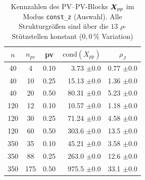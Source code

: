 \begin{table}[htbp]
	\centering
	\caption{Kennzahlen des PV--PV-Blocks $\boldsymbol{X}_{pp}$ im Modus
			\texttt{const\_z} (Auswahl). Alle Strukturgrößen sind über die $13$
			$\rho$-Stützstellen konstant ($0{,}0\,\%$ Variation)}
	\label{tab:pv-pv-orthogonal}
\begin{tabular}{cccrc}
	\toprule
	$n$ & $n_{pv}$ & pv & $\mathrm{cond}(X_{pp})$ & $\rho_J$ \\
	\midrule
	40  & 4   & 0.10 & 3.73  $\pm$0.0 & 0.77 $\pm$0.0   \\
	40  & 10  & 0.25 & 15.13 $\pm$0.0 & 1.36 $\pm$0.0  \\
	40  & 20  & 0.50 & 80.31 $\pm$0.0 & 5.23 $\pm$0.0  \\
	120 & 12  & 0.10 & 10.57 $\pm$0.0 & 1.18 $\pm$0.0 \\
	120 & 30  & 0.25 & 71.24 $\pm$0.0 & 4.58 $\pm$0.0 \\
	120 & 60  & 0.50 & 303.6 $\pm$0.0 & 13.5 $\pm$0.0  \\
	350 & 35  & 0.10 & 45.21 $\pm$0.0 & 3.58 $\pm$0.0  \\
	350 & 88  & 0.25 & 263.0 $\pm$0.0 & 12.6 $\pm$0.0  \\
	350 & 175 & 0.50 & 975.5 $\pm$0.0 & 33.1 $\pm$0.0  \\
	\bottomrule
\end{tabular}
	
	\medskip
%	
\end{table}

